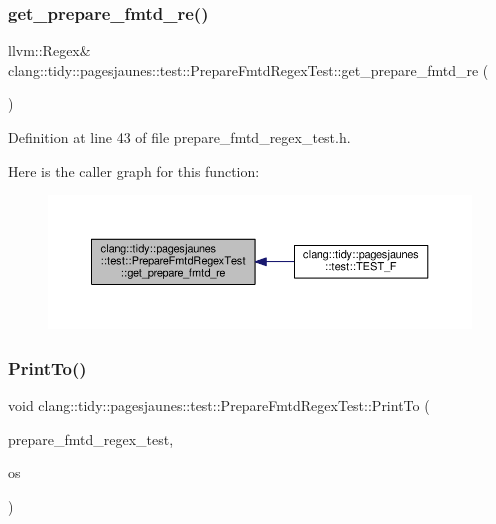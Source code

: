 \subsubsection{\texorpdfstring{get\+\_\+prepare\+\_\+fmtd\+\_\+re()}{get\_prepare\_fmtd\_re()}}
{\footnotesize\ttfamily llvm\+::\+Regex\& clang\+::tidy\+::pagesjaunes\+::test\+::\+Prepare\+Fmtd\+Regex\+Test\+::get\+\_\+prepare\+\_\+fmtd\+\_\+re (\begin{DoxyParamCaption}{ }\end{DoxyParamCaption})\hspace{0.3cm}{\ttfamily [inline]}}



Definition at line 43 of file prepare\+\_\+fmtd\+\_\+regex\+\_\+test.\+h.

Here is the caller graph for this function\+:
\nopagebreak
\begin{figure}[H]
\begin{center}
\leavevmode
\includegraphics[width=350pt]{classclang_1_1tidy_1_1pagesjaunes_1_1test_1_1_prepare_fmtd_regex_test_aca9612af31453209644fdc7f9a564aee_icgraph}
\end{center}
\end{figure}
\mbox{\label{classclang_1_1tidy_1_1pagesjaunes_1_1test_1_1_prepare_fmtd_regex_test_a6c5f05c2a94ac050fe0ba8d1390cae63}} 
\subsubsection{\texorpdfstring{Print\+To()}{PrintTo()}}
{\footnotesize\ttfamily void clang\+::tidy\+::pagesjaunes\+::test\+::\+Prepare\+Fmtd\+Regex\+Test\+::\+Print\+To (\begin{DoxyParamCaption}\item[{const \hyperlink{classclang_1_1tidy_1_1pagesjaunes_1_1test_1_1_prepare_fmtd_regex_test}{Prepare\+Fmtd\+Regex\+Test} \&}]{prepare\+\_\+fmtd\+\_\+regex\+\_\+test,  }\item[{\+::std\+::ostream $\ast$}]{os }\end{DoxyParamCaption})}



